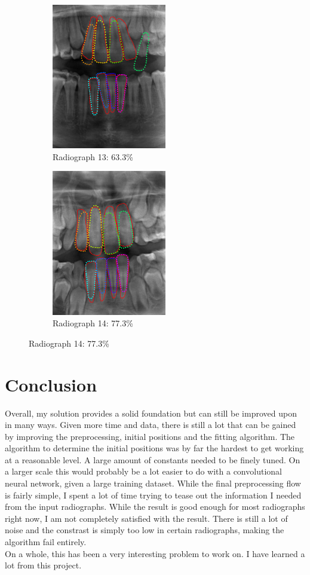 \documentclass[a4paper,10pt]{article}
\begin{document}
\begin{figure}
\begin{subfigure}{.33\textwidth}
\centering
\includegraphics[width=50mm]{tooth_result_overlay_13.png}
\caption{Radiograph 13: 63.3\%}
\end{subfigure}%
\begin{subfigure}{.33\textwidth}
\centering
\includegraphics[width=50mm]{tooth_result_overlay_14.png}
\caption{Radiograph 14: 77.3\%}
\end{subfigure}%
\end{figure}

\section{Conclusion}
Overall, my solution provides a solid foundation but can still be improved upon in many ways. Given more time and data, there is still a lot that can be gained by improving the preprocessing, initial positions and the fitting algorithm. The algorithm to determine the initial positions was by far the hardest to get working at a reasonable level. A large amount of constants needed to be finely tuned. On a larger scale this would probably be a lot easier to do with a convolutional neural network, given a large training dataset. While the final preprocessing flow is fairly simple, I spent a lot of time trying to tease out the information I needed from the input radiographs. While the result is good enough for most radiographs right now, I am not completely satisfied with the result. There is still a lot of noise and the constrast is simply too low in certain radiographs, making the algorithm fail entirely. \\ On a whole, this has been a very interesting problem to work on. I have learned a lot from this project.
 

\end{document}
